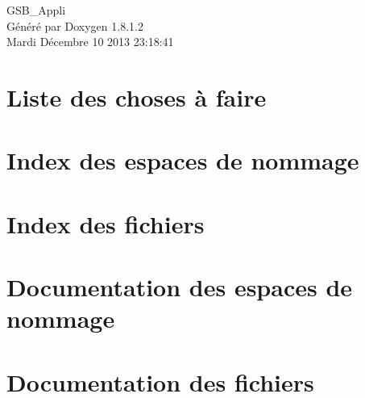 \documentclass{book}
\begin{document}
\hypersetup{pageanchor=false,citecolor=blue}
\begin{titlepage}
\vspace*{7cm}
\begin{center}
{\Large G\-S\-B\-\_\-\-Appli }\\
\vspace*{1cm}
{\large Généré par Doxygen 1.8.1.2}\\
\vspace*{0.5cm}
{\small Mardi Décembre 10 2013 23:18:41}\\
\end{center}
\end{titlepage}
\clearemptydoublepage
{}
\tableofcontents
\clearemptydoublepage
{}
\hypersetup{pageanchor=true,citecolor=blue}
\chapter{Liste des choses à faire}
\label{todo}
\hypertarget{todo}{}

\chapter{Index des espaces de nommage}

\chapter{Index des fichiers}

\chapter{Documentation des espaces de nommage}

\chapter{Documentation des fichiers}













\printindex
\end{document}
